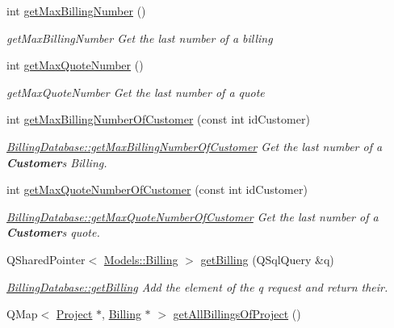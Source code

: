 \begin{DoxyCompactItemize}
int \hyperlink{classDatabases_1_1BillingDatabase_a57e4b68cac145ba400d408698312599b}{get\+Max\+Billing\+Number} ()
\begin{DoxyCompactList}\small\item\em get\+Max\+Billing\+Number Get the last number of a billing \end{DoxyCompactList}\item 
int \hyperlink{classDatabases_1_1BillingDatabase_a91704d31741279aacf9a9903b7ebcbf5}{get\+Max\+Quote\+Number} ()
\begin{DoxyCompactList}\small\item\em get\+Max\+Quote\+Number Get the last number of a quote \end{DoxyCompactList}\item 
int \hyperlink{classDatabases_1_1BillingDatabase_a78cf9a2e6d059fcf20136aa4b0b9d7ba}{get\+Max\+Billing\+Number\+Of\+Customer} (const int id\+Customer)
\begin{DoxyCompactList}\small\item\em \hyperlink{classDatabases_1_1BillingDatabase_a78cf9a2e6d059fcf20136aa4b0b9d7ba}{Billing\+Database\+::get\+Max\+Billing\+Number\+Of\+Customer} Get the last number of a {\bfseries Customer}\textquotesingle{}s Billing. \end{DoxyCompactList}\item 
int \hyperlink{classDatabases_1_1BillingDatabase_a0cbeb663b7246adb4209b2da2e691429}{get\+Max\+Quote\+Number\+Of\+Customer} (const int id\+Customer)
\begin{DoxyCompactList}\small\item\em \hyperlink{classDatabases_1_1BillingDatabase_a0cbeb663b7246adb4209b2da2e691429}{Billing\+Database\+::get\+Max\+Quote\+Number\+Of\+Customer} Get the last number of a {\bfseries Customer}\textquotesingle{}s quote. \end{DoxyCompactList}\item 
Q\+Shared\+Pointer$<$ \hyperlink{classModels_1_1Billing}{Models\+::\+Billing} $>$ \hyperlink{classDatabases_1_1BillingDatabase_a2e6c6cd8b3b040eeb7fc6ae727e85013}{get\+Billing} (Q\+Sql\+Query \&q)
\begin{DoxyCompactList}\small\item\em \hyperlink{classDatabases_1_1BillingDatabase_a835d4ca35a046fe1d0b336a1b8cf8f85}{Billing\+Database\+::get\+Billing} Add the element of the {\itshape q} request and return their. \end{DoxyCompactList}\item 
Q\+Map$<$ \hyperlink{classModels_1_1Project}{Project} $\ast$, \hyperlink{classModels_1_1Billing}{Billing} $\ast$ $>$ \hyperlink{classDatabases_1_1BillingDatabase_a44c3e09fbb7d540579f4cceae4d6901f}{get\+All\+Billings\+Of\+Project} ()

\end{DoxyCompactItemize}
